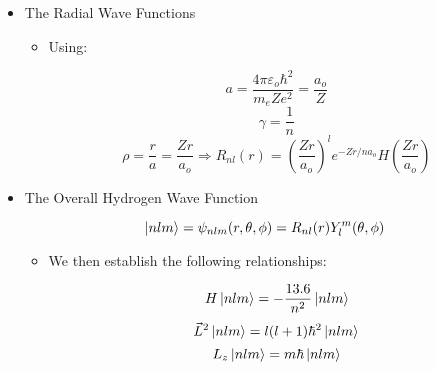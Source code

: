 \begin{itemize}
\begin{itemize}
\begin{itemize}
        \end{itemize}

    \end{itemize}

  \item The Radial Wave Functions

    \begin{itemize}

      \item Using:

        $$a=\frac{4\pi\varepsilon_o\hbar^2}{m_eZe^2}=\frac{a_o}{Z}$$
        $$\gamma=\frac{1}{n}$$
        $$\rho=\frac{r}{a}=\frac{Zr}{a_o}\Rightarrow R_{nl}(r)=\left( \frac{Zr}{a_o} \right)^le^{-Zr/na_o}H\left(\frac{Zr}{a_o}\right)$$

    \end{itemize}

  \item The Overall Hydrogen Wave Function

    $$\ket{nlm}=\psi_{nlm}(r,\theta,\phi)=R_{nl}(r)Y_{l}^m(\theta,\phi)$$

    \begin{itemize}

      \item We then establish the following relationships:

        $$H\ket{nlm}=-\frac{13.6}{n^2}\ket{nlm}$$
        $$\vec{L}^2\ket{nlm}=l(l+1)\hbar^2\ket{nlm}$$
        $$L_z\ket{nlm}=m\hbar\ket{nlm}$$

    \end{itemize}

\end{itemize}



